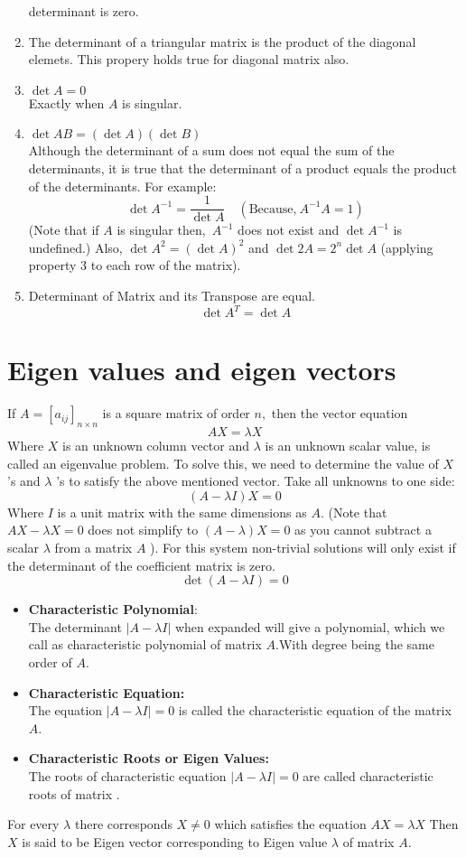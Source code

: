 \begin{enumerate}
	determinant is zero.
	\item The determinant of a triangular matrix is the product of the diagonal elemets. This propery holds true for diagonal matrix also.
	\item $\operatorname{det} A=0$\\  Exactly when $A$ is singular.
	\item $\operatorname{det} A B=(\operatorname{det} A)(\operatorname{det} B)$\\
	Although the determinant of a sum does not equal the sum of the determinants, it is true that the determinant of a product equals the product of the determinants. For example:
	$$
	\operatorname{det} A^{-1}=\frac{1}{\operatorname{det} A}\quad 	(\text{Because,}\ A^{-1} A=1)
	$$
	(Note that if $A$ is singular then,\  $A^{-1}$ does not exist and $\operatorname{det} A^{-1}$ is undefined.) Also, $\operatorname{det} A^{2}=(\operatorname{det} A)^{2}$ and $\operatorname{det} 2 A=2^{n} \operatorname{det} A$
	(applying property 3 to each row of the matrix). 
	\item Determinant of Matrix and its Transpose are equal. $$\operatorname{det} A^{T}=\operatorname{det} A$$
\end{enumerate}
\section{Eigen values and eigen vectors}

 If $A=\left[a_{i j}\right]_{n \times n}$ is a square matrix of order $n,$ then the vector equation $$A X=\lambda X$$ Where $X$ is an unknown column vector and $\lambda$ is an unknown scalar value, is called an eigenvalue problem. To solve this, we need to determine the value of $X$ 's and $\lambda$ 's to satisfy the above mentioned vector.
 Take all unknowns to one side:$$(A-\lambda I) X=0$$
 Where $I$ is a unit matrix with the same dimensions as $A$.
 (Note that $A X-\lambda X=0$ does not simplify to $(A-\lambda) X=0$ as you cannot subtract a scalar $\lambda$ from a matrix $A$ ).
 For this system non-trivial solutions will only exist if the determinant of the coefficient matrix is zero.
 $$
 \operatorname{det}(A-\lambda I)=0
 $$
 \begin{itemize}
 	\item \textbf{Characteristic Polynomial}:\\ The determinant $|A-\lambda I|$ when expanded will give a polynomial, which we call as characteristic polynomial of matrix $A$.With degree being the same order of $A$.
 	\item \textbf{Characteristic Equation:}\\ The equation $|A-\lambda I|=0$ is called the characteristic equation of the matrix $A$.
 	\item \textbf{Characteristic Roots or Eigen Values:}\\ The roots of characteristic equation $|A-\lambda I|=0$ are called characteristic roots of matrix .
 \end{itemize}
For every $\lambda$ there corresponds $X\neq 0$ which satisfies the equation $A X=\lambda X$
Then $X$ is said to be Eigen vector corresponding to Eigen value $\lambda$ of matrix $A$.


